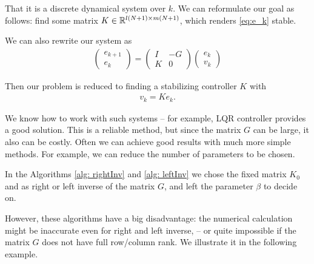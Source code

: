 That it is a discrete dynamical system over $k$. We can reformulate our goal as follows: find some matrix $K \in {\mathbb{R}}^{l(N+1) \times m (N+1)}$, which renders \eqref{eq:e_k} stable. %

We can also rewrite our system as
\begin{align}
\label{eq:ILC:e_kPlant}
\begin{pmatrix}
e_{k+1} \\ e_k
\end{pmatrix} = 
\left(
\begin{array}{c|c}
I & -G \\\hline K & 0
\end{array}\right) \begin{pmatrix}
e_k \\ v_k 
\end{pmatrix}
\end{align}

Then our problem is reduced to finding a stabilizing controller $K$  with 
\begin{align}
v_k = K e_k.
\end{align} 

We know how to work with such systems -- for example, LQR controller provides a good solution. This is a reliable method, but since the matrix $G$ can be large, it also can be costly. Often we can achieve good results with much more simple methods. For example, we can reduce the number of parameters to be chosen. 

In the Algorithms \ref{alg: rightInv} and \ref{alg: leftInv} we chose the fixed matrix $K_0$ and as right or left inverse of the matrix $G$, and left the parameter $\beta$ to decide on. 

However, these algorithms have a big disadvantage: the numerical calculation might be inaccurate even for right and left inverse, -- or quite impossible if the matrix $G$ does not have full row/column rank. We illustrate it in the following example. 

